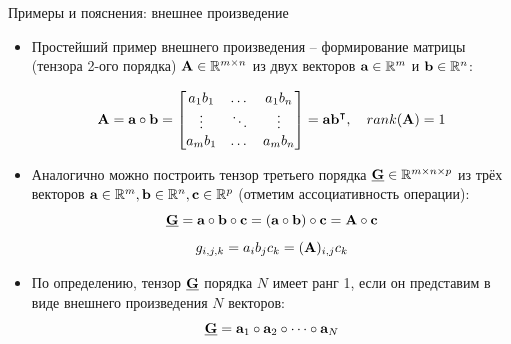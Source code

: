 \begin{frame}{Примеры и пояснения: внешнее произведение}
 

    \begin{itemize}
        \item Простейший пример внешнего произведения -- формирование матрицы (тензора 2-ого порядка) $\textbf{A} \in \mathbb{R}^{m \times n}$ из двух векторов $\textbf{a} \in \mathbb{R}^m$ и $\textbf{b} \in \mathbb{R}^n$:

        $$ \textbf{A} = \textbf{a} \circ \textbf{b} = 
        \begin{bmatrix}
        a_1 b_1 & \dots & a_1 b_n \\
        \vdots & \ddots & \vdots \\
        a_m b_1 & \dots & a_m b_n 
        \end{bmatrix} = \textbf{a}\textbf{b}^\intercal, \quad rank(\textbf{A}) = 1$$

        \item Аналогично можно построить тензор третьего порядка $\underline{\textbf{G}} \in \mathbb{R}^{m\times n\times p}$ из трёх векторов $\textbf{a} \in \mathbb{R}^m, \textbf{b} \in \mathbb{R}^n, \textbf{c} \in \mathbb{R}^p$ (отметим ассоциативность операции):
        $$ \underline{\textbf{G}} = \textbf{a} \circ \textbf{b} \circ \textbf{c} = (\textbf{a} \circ \textbf{b}) \circ \textbf{c}  = \textbf{A} \circ \textbf{c}$$
        $$ g_{i,j,k} = a_i b_j c_k = (\textbf{A})_{i,j}c_k$$
        \item По определению, тензор $\underline{\textbf{G}}$ порядка $N$ имеет ранг 1, если он представим в виде внешнего произведения $N$ векторов:
        $$ \underline{\textbf{G}} = \textbf{a}_1 \circ \textbf{a}_2 \circ \dots \circ \textbf{a}_N$$
    \end{itemize}


\end{frame}

